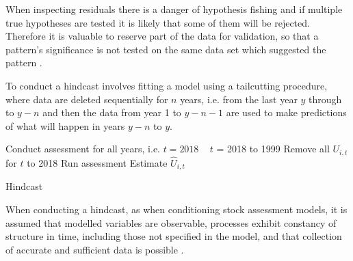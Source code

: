 
When inspecting residuals there is a danger of hypothesis fishing and if multiple true hypotheses are tested it is likely that some of them will be rejected. Therefore it is valuable to reserve part of the data for validation, so that a pattern’s significance is not tested on the same data set which suggested the pattern \citep{thygesen2017validation}.


To conduct a hindcast involves fitting a model using a tailcutting procedure, where data are deleted sequentially for $n$ years, i.e. from the last year $y$ through to $y−n$ and then the data from year 1 to $y−n−1$ are used to make predictions of what will happen in years $y−n$ to $y$.

\begin{algorithm}[!ht]
\begin{algorithmic}[1]

\State Conduct assessment for all years, i.e. $t=2018$
\For ~ $t$ = 2018 to 1999
\State Remove all $U_{i,t}$ for $t$ to 2018
\State Run assessment
\State Estimate $\hat{U}_{i,t}$ 
\EndFor
\caption{Hindcast~\citep{kell2016xval}}
\label{Hindcast}
\end{algorithmic}
\end{algorithm}

When conducting a hindcast, as when conditioning stock assessment models, it is assumed that modelled variables are observable, processes exhibit constancy of structure in time, including those not specified in the model, and that collection of accurate and sufficient data is possible \citep{hodges1992you}.
